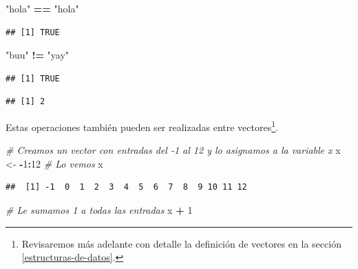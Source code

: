 \documentclass[]{article}
\newenvironment{Shaded}{\begin{snugshade}}{\end{snugshade}}
\newcommand{\DecValTok}[1]{\textcolor[rgb]{0.00,0.00,0.81}{#1}}
\newcommand{\StringTok}[1]{\textcolor[rgb]{0.31,0.60,0.02}{#1}}
\newcommand{\CommentTok}[1]{\textcolor[rgb]{0.56,0.35,0.01}{\textit{#1}}}
\newcommand{\OperatorTok}[1]{\textcolor[rgb]{0.81,0.36,0.00}{\textbf{#1}}}
\newcommand{\NormalTok}[1]{#1}
\let\rmarkdownfootnote\footnote%
\def\footnote{\protect\rmarkdownfootnote}
\begin{document}
\begin{Shaded}
\begin{Highlighting}[]
\StringTok{"hola"} \OperatorTok{==}\StringTok{ "hola"}
\end{Highlighting}
\end{Shaded}

\begin{verbatim}
## [1] TRUE
\end{verbatim}

\begin{Shaded}
\begin{Highlighting}[]
\StringTok{"buu"} \OperatorTok{!=}\StringTok{ "yay"}
\end{Highlighting}
\end{Shaded}

\begin{verbatim}
## [1] TRUE
\end{verbatim}

\begin{Shaded}
\end{Shaded}

\begin{verbatim}
## [1] 2
\end{verbatim}

Estas operaciones también pueden ser realizadas entre
vectores\footnote{Revisaremos más adelante con detalle la definición de vectores en la sección \ref{estructuras-de-datos}.}.

\begin{Shaded}
\begin{Highlighting}[]
\CommentTok{# Creamos un vector con entradas del -1 al 12 y lo asignamos a la variable x}
\NormalTok{x <-}\StringTok{ }\OperatorTok{-}\DecValTok{1}\OperatorTok{:}\DecValTok{12}
\CommentTok{# Lo vemos}
\NormalTok{x}
\end{Highlighting}
\end{Shaded}

\begin{verbatim}
##  [1] -1  0  1  2  3  4  5  6  7  8  9 10 11 12
\end{verbatim}

\begin{Shaded}
\begin{Highlighting}[]
\CommentTok{# Le sumamos 1 a todas las entradas}
\NormalTok{x }\OperatorTok{+}\StringTok{ }\DecValTok{1}
\end{Highlighting}
\end{Shaded}
\end{document}
